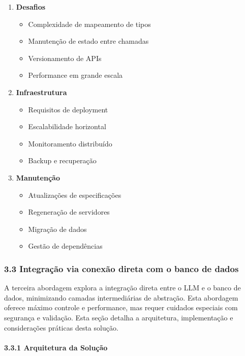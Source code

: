 \documentclass[
]{article}
\providecommand{\tightlist}{%
  \setlength{\itemsep}{0pt}\setlength{\parskip}{0pt}}
\begin{document}
\begin{enumerate}
\def\labelenumi{\arabic{enumi}.}
\item
  \textbf{Desafios}

  \begin{itemize}
  \tightlist
  \item
    Complexidade de mapeamento de tipos
  \item
    Manutenção de estado entre chamadas
  \item
    Versionamento de APIs
  \item
    Performance em grande escala
  \end{itemize}
\item
  \textbf{Infraestrutura}

  \begin{itemize}
  \tightlist
  \item
    Requisitos de deployment
  \item
    Escalabilidade horizontal
  \item
    Monitoramento distribuído
  \item
    Backup e recuperação
  \end{itemize}
\item
  \textbf{Manutenção}

  \begin{itemize}
  \tightlist
  \item
    Atualizações de especificações
  \item
    Regeneração de servidores
  \item
    Migração de dados
  \item
    Gestão de dependências
  \end{itemize}
\end{enumerate}

\subsubsection{3.3 Integração via conexão direta com o banco de
dados}\label{integrauxe7uxe3o-via-conexuxe3o-direta-com-o-banco-de-dados}

A terceira abordagem explora a integração direta entre o LLM e o banco
de dados, minimizando camadas intermediárias de abstração. Esta
abordagem oferece máximo controle e performance, mas requer cuidados
especiais com segurança e validação. Esta seção detalha a arquitetura,
implementação e considerações práticas desta solução.

\paragraph{3.3.1 Arquitetura da
Solução}\label{arquitetura-da-soluuxe7uxe3o-2}
\end{document}
